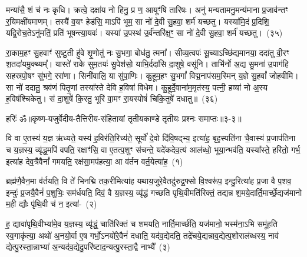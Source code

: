 मन्या॑सै॒ शं च॑ नः कृधि। क्रत्वे॒ दक्षा॑य नो हिनु॒ प्र ण॒ आयूꣳ॑षि तारिषः। अनु॑ मन्यतामनु॒मन्य॑माना प्र॒जाव॑न्तꣳ र॒यिमक्षी॑यमाणम्। तस्यै॑ व॒यꣳ हेड॑सि॒ मा\-ऽपि॑ भूम॒ सा नो॑ दे॒वी सु॒हवा॒ शर्म॑ यच्छतु। यस्या॑मि॒दं प्र॒दिशि॒ यद्वि॒रोच॒ते\-ऽनु॑मतिं॒ प्रति॑ भूषन्त्या॒यवः॑। यस्या॑ उ॒पस्थ॑ उ॒र्व॑न्तरि॑क्ष॒ꣳ॒ सा नो॑ दे॒वी सु॒हवा॒ शर्म॑ यच्छतु।~(३५)

रा॒काम॒हꣳ सु॒हवाꣳ॑ सुष्टु॒ती हु॑वे शृ॒णोतु॑ नः सु॒भगा॒ बोध॑तु॒ त्मना᳚। सीव्य॒त्वपः॑ सू॒च्या\-ऽच्छि॑द्यमानया॒ ददा॑तु वी॒रꣳ श॒तदा॑यमु॒क्थ्यम्᳚। यास्ते॑ राके सुम॒तयः॑ सु॒पेश॑सो॒ याभि॒र्ददा॑सि दा॒शुषे॒ वसू॑नि। ताभि॑र्नो अ॒द्य सु॒मना॑ उ॒पाग॑हि सहस्रपो॒षꣳ सु॑भगे॒ ररा॑णा। सिनी॑वालि॒ या सु॑पा॒णिः। कु॒हूम॒हꣳ सु॒भगां᳚ विद्म॒नाप॑सम॒स्मिन् य॒ज्ञे सु॒हवां᳚ जोहवीमि। सा नो॑ ददातु॒ श्रव॑णं पितृ॒णां तस्या᳚स्ते देवि ह॒विषा॑ विधेम। कु॒हूर्दे॒वाना॑म॒मृत॑स्य॒ पत्नी॒ हव्या॑ नो अ॒स्य ह॒विष॑श्चिकेतु। सं दा॒शुषे॑ कि॒रतु॒ भूरि॑ वा॒मꣳ रा॒यस्पोषं॑ चिकि॒तुषे॑ दधातु॥~(३६)

{\anuvakamend[{भामा॑सो॒ दाता॒ त्वम॒न्तरि॑क्ष॒ꣳ॒ सा नो॑ दे॒वी सु॒हवा॒ शर्म॑ यच्छतु॒ श्रव॑णं॒ चतु॑र्विꣳशतिश्च}]}%

{हरिः॑ ॐ}{॥कृष्ण-यजुर्वेदीय-तैत्तिरीय-संहितायां तृतीयकाण्डे तृतीयः प्रश्नः समाप्तः॥३-३॥}

\setcounter{anuvakam}{0}
वि वा ए॒तस्य॑ य॒ज्ञ ऋ॑ध्यते॒ यस्य॑ ह॒विर॑ति॒रिच्य॑ते॒ सूर्यो॑ दे॒वो दि॑वि॒षद्भ्य॒ इत्या॑ह॒ बृह॒स्पति॑ना चै॒वास्य॑ प्र॒जा\-प॑तिना च य॒ज्ञस्य॒ व्यृ॑द्ध॒मपि॑ वपति॒ रक्षाꣳ॑सि॒ वा ए॒तत्प॒शुꣳ स॑चन्ते॒ यदे॑कदेव॒त्य॑ आल॑ब्धो॒ भूया॒न्भव॑ति॒ यस्या᳚स्ते॒ हरि॑तो॒ गर्भ॒ इत्या॑ह देव॒त्रैवैनां᳚ गमयति॒ रक्ष॑सा॒मप॑हत्या॒ आ व॑र्तन वर्त॒येत्या॑ह॒~(१)

ब्रह्म॑णै॒वैन॒मा व॑र्तयति॒ वि ते॑ भिनद्मि तक॒रीमित्या॑ह यथाय॒जुरे॒वैतदु॑रुद्र॒फ्सो वि॒श्वरू॑प॒ इन्दु॒रित्या॑ह प्र॒जा वै प॒शव॒ इन्दुः॑ प्र॒जयै॒वैनं॑ प॒शुभिः॒ सम॑र्धयति॒ दिवं॒ वै य॒ज्ञस्य॒ व्यृ॑द्धं गच्छति पृथि॒वीमति॑रिक्तं॒ तद्यन्न श॒मये॒दार्ति॒मार्च्छे॒द्यज॑मानो म॒ही द्यौः पृ॑थि॒वी च॑ न॒ इत्या॑-~(२)

ह॒ द्यावा॑\-पृथि॒वीभ्या॑मे॒व य॒ज्ञस्य॒ व्यृ॑द्धं॒ चाति॑रिक्तं च शमयति॒ नार्ति॒मार्च्छ॑ति॒ यज॑मानो॒ भस्म॑ना॒\-ऽभि समू॑हति स्व॒गाकृ॑त्या॒ अथो॑ अ॒नयो॒र्वा ए॒ष गर्भो॒\-ऽनयो॑रे॒वैनं॑ दधाति॒ यद॑व॒द्येदति॒ तद्रे॑चये॒द्यन्नाव॒द्येत्प॒शोराल॑ब्धस्य॒ नाव॑ द्येत्पु॒रस्ता॒न्नाभ्या॑ अ॒न्यद॑व॒द्येदु॒परि॑ष्टाद॒न्यत्पु॒रस्ता॒द्वै नाभ्यै᳚~(३)

